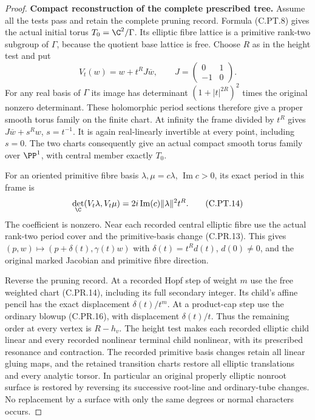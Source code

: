 \begin{proof}
\par\medskip\noindent\textbf{Compact reconstruction of the complete prescribed tree.}
Assume all the tests pass and retain the
complete pruning record. Formula (C.PT.8)
gives the actual initial torus
$T_0=\C^2/\Gamma$. Its elliptic fibre
lattice is a primitive rank-two subgroup
of $\Gamma$, because the quotient base
lattice is free. Choose $R$ as in the
height test and put
\[
 V_t(w)=w+t^R J\overline w,\qquad
              J=\begin{pmatrix}0&1\\-1&0\end{pmatrix}.
 \tag{C.PT.13}
\]
For any real basis of $\Gamma$ its image
has determinant $(1+|t|^{2R})^2$ times
the original nonzero determinant.
These holomorphic period sections
therefore give a proper smooth torus
family on the finite chart. At infinity
the frame divided by $t^R$ gives
$J\overline w+s^Rw$, $s=t^{-1}$.
It is again real-linearly invertible
at every point, including $s=0$.
The two charts consequently give an
actual compact smooth torus family
over $\PP^1$, with central member
exactly $T_0$.

For an oriented primitive fibre basis
$\lambda,\mu=c\lambda$,
$\operatorname{Im}c>0$, its exact period
in this frame is
\[
 \det_{\C}(V_t\lambda,V_t\mu)
       =2i\operatorname{Im}(c)\|\lambda\|^2t^R.
 \tag{C.PT.14}
\]
The coefficient is nonzero. Near each
recorded central elliptic fibre use
the actual rank-two period cover and
the primitive-basis change (C.PR.13).
This gives
$(p,w)\mapsto(p+\delta(t),\gamma(t)w)$
with $\delta(t)=t^R d(t)$, $d(0)\ne0$,
and the original marked Jacobian and
primitive fibre direction.

Reverse the pruning record. At a
recorded Hopf step of weight $m$ use
the free weighted chart (C.PR.14),
including its full secondary integer.
Its child's affine pencil has the
exact displacement $\delta(t)/t^m$.
At a product-cap step use the ordinary
blowup (C.PR.16), with displacement
$\delta(t)/t$. Thus the remaining
order at every vertex is $R-h_v$.
The height test makes each recorded
elliptic child linear and every
recorded nonlinear terminal child
nonlinear, with its prescribed
resonance and contraction. The
recorded primitive basis changes
retain all linear gluing maps,
and the retained transition charts
restore all elliptic translations
and every analytic torsor. In particular an
original properly elliptic nonroot surface
is restored by reversing its successive
root-line and ordinary-tube changes. No
replacement by a surface with only the same
degrees or normal characters occurs.


\end{proof}
